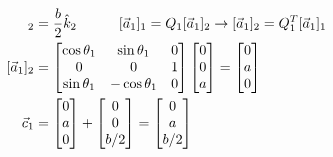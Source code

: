 \documentclass[conference]{IEEEtran}
\begin{document}
\begin{align*}
    [\vec{s}_1]_2 & = \frac{b}{2} \hat{k}_2 \hspace{30px} [\vec{a}_1]_1 = Q_1 [\vec{a}_1]_2 \rightarrow [\vec{a}_1]_2 = Q_1^T [\vec{a}_1]_1 \\
    [\vec{a}_1]_2 & = \begin{bmatrix}
                          \cos \theta_1 & \sin \theta_1   & 0 \\
                          0             & 0               & 1 \\
                          \sin \theta_1 & - \cos \theta_1 & 0
                      \end{bmatrix} \begin{bmatrix}
                                        0 \\
                                        0 \\
                                        a
                                    \end{bmatrix} = \begin{bmatrix}
                                                        0 \\
                                                        a \\
                                                        0
                                                    \end{bmatrix}                                                                          \\
    \vec{c}_1     & = \begin{bmatrix}
                          0 \\
                          a \\
                          0
                      \end{bmatrix}  + \begin{bmatrix}
                                           0 \\
                                           0 \\
                                           b/2
                                       \end{bmatrix}        = \begin{bmatrix}
                                                                  0 \\
                                                                  a \\
                                                                  b/2

\end{bmatrix}
\end{align*}
\end{document}
